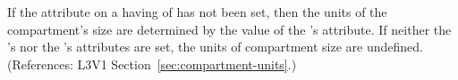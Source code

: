 If the  attribute on a \Compartment having
 of  has not been set, then the units of
the compartment's size are determined by the value of the \Model's
 attribute.  If neither the \Compartment's 
nor the \Model's  attributes are set, the units of
compartment size are undefined.  (References: L3V1
Section~\ref{sec:compartment-units}.)
